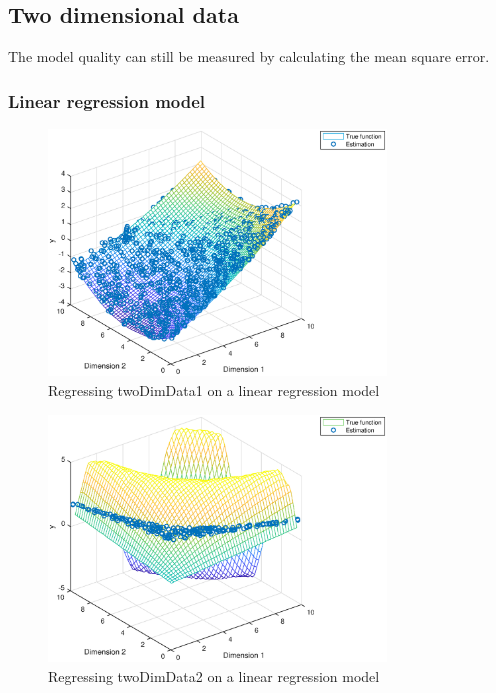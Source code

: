\documentclass[]{article}
\begin{document}
\subsection{Two dimensional data}

The model quality can still be measured by calculating the  mean square error.

\subsubsection{Linear regression model}
\begin{figure}[H]
	\caption{Regressing twoDimData1 on a linear regression model}
	\label{fig:twodimData1}
	\centering
	\includegraphics[width=0.8\textwidth]{project41c1}
\end{figure}

\begin{figure}[H]
	\caption{Regressing twoDimData2 on a linear regression model}
	\label{fig:twodimData2}
	\centering
	\includegraphics[width=0.8\textwidth]{project41c2}
\end{figure}
\end{document}
